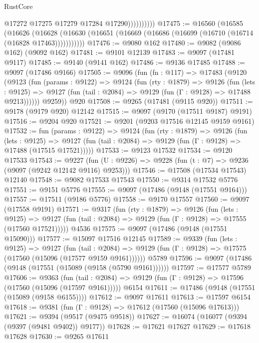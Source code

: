 \begin{lexlean}{RustCore}
\begin{coremodule}
                        @17272
                        @17275
                        @17279
                        @17284
                        @17290))))))))))
@17475 := @16560
    (@16585
      (@16626
        (@16628 (@16630 (@16651 (@16669 (@16686 (@16699 (@16710 (@16714 (@16828 @17463)))))))))))
@17476 := @9080 @162
@17480 := @9082 (@9086 @162) (@9092 @162)
@17481 := @9101 @12139
@17483 := @9097 (@17481 @9117)
@17485 := @9140 (@9141 @162)
@17486 := @9136 @17485
@17488 := @9097 (@17486 @9166)
@17505 := @9096
    (fun (fn : @117) =>
    @17483
      (@9120
        (@9123
          (fun (params : @9122) =>
          @9124
            (fun (rty : @1879) =>
            @9126
              (fun (lets : @9125) =>
              @9127 (fun (tail : @2084) => @9129 (fun (Γ : @9128) => @17488 @9213))))))
        @9259))
    @920
@17508 := @9265 (@17481 (@9115 @920))
@17511 := @9178 (@9179 @920) @12142
@17515 := @9097 (@9170 (@17511 @9187) @9191)
@17516 := @9204 @920
@17521 := @9201 (@9203 @17516 @12145 @9159 @9161)
@17532 := fun (params : @9122) =>
  @9124
    (fun (rty : @1879) =>
    @9126
      (fun (lets : @9125) =>
      @9127 (fun (tail : @2084) => @9129 (fun (Γ : @9128) => @17488 (@17515 @17521)))))
@17533 := @9123 @17532
@17534 := @9120 @17533
@17543 := @9227
    (fun (U : @9226) => @9228 (fun (t : @7) => @9236 (@9097 (@9242 @12142 @9116) @9253)))
@17546 := @17508 (@17534 @17543) @12140
@17548 := @9082 @17533 @17543
@17550 := @9314 @17532 @5776
@17551 := @9151 @5776
@17555 := @9097 (@17486 (@9148 (@17551 @9164)))
@17557 := @17511 (@9186 @5776)
@17558 := @9170 @17557
@17560 := @9097 (@17558 @9191)
@17571 := @9317
    (fun (rty : @1879) =>
    @9126
      (fun (lets : @9125) =>
      @9127 (fun (tail : @2084) => @9129 (fun (Γ : @9128) => @17555 (@17560 @17521)))))
    @4536
@17575 := @9097 (@17486 (@9148 (@17551 @15090)))
@17577 := @15097 @17516 @12145
@17589 := @9339
    (fun (lets : @9125) =>
    @9127
      (fun (tail : @2084) =>
      @9129 (fun (Γ : @9128) => @17575 (@17560 (@15096 (@17577 @9159 @9161))))))
    @5789
@17596 := @9097 (@17486 (@9148 (@17551 (@15089 (@9158 (@5790 @9161))))))
@17597 := @17577 @5789
@17606 := @9363
    (fun (tail : @2084) => @9129 (fun (Γ : @9128) => @17596 (@17560 (@15096 (@17597 @9161)))))
    @6154
@17611 := @17486 (@9148 (@17551 (@15089 (@9158 @6155))))
@17612 := @9097 @17611
@17613 := @17597 @6154
@17618 := @9381 (fun (Γ : @9128) => @17612 (@17560 (@15096 @17613)))
@17621 := @9394 (@9517 (@9475 @9518))
@17627 := @16074 (@16077 (@9394 (@9397 (@9481 @9402)) @9177))
@17628 := @17621 @17627
@17629 := @17618 @17628
@17630 := @9265 @17611

\end{coremodule}
\end{lexlean}
